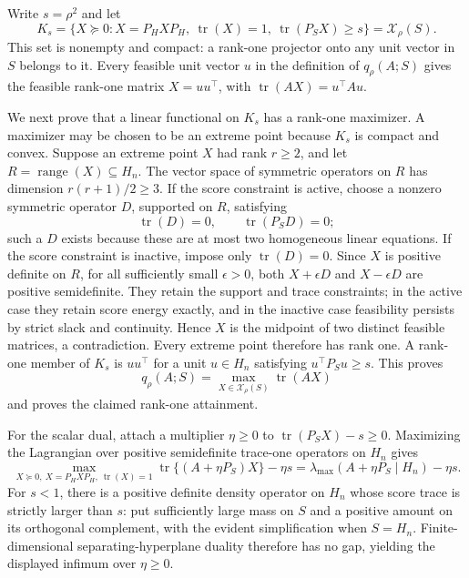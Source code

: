 Write \(s=\rho^2\) and let
\[
K_s=\{X\succeq0:X=P_HXP_H,\ \operatorname{tr}(X)=1,
\ \operatorname{tr}(P_SX)\geq s\}=\mathcal X_\rho(S).
\]
This set is nonempty and compact: a rank-one projector onto any unit vector in \(S\) belongs to it.  Every feasible unit vector \(u\) in the definition of \(q_\rho(A;S)\) gives the feasible rank-one matrix \(X=uu^\top\), with \(\operatorname{tr}(AX)=u^\top Au\).

We next prove that a linear functional on \(K_s\) has a rank-one maximizer.  A maximizer may be chosen to be an extreme point because \(K_s\) is compact and convex.  Suppose an extreme point \(X\) had rank \(r\geq2\), and let \(R=\operatorname{range}(X)\subseteq H_n\).  The vector space of symmetric operators on \(R\) has dimension \(r(r+1)/2\geq3\).  If the score constraint is active, choose a nonzero symmetric operator \(D\), supported on \(R\), satisfying
\[
\operatorname{tr}(D)=0,
\qquad \operatorname{tr}(P_SD)=0;
\]
such a \(D\) exists because these are at most two homogeneous linear equations.  If the score constraint is inactive, impose only \(\operatorname{tr}(D)=0\).  Since \(X\) is positive definite on \(R\), for all sufficiently small \(\epsilon>0\), both \(X+\epsilon D\) and \(X-\epsilon D\) are positive semidefinite.  They retain the support and trace constraints; in the active case they retain score energy exactly, and in the inactive case feasibility persists by strict slack and continuity.  Hence \(X\) is the midpoint of two distinct feasible matrices, a contradiction.  Every extreme point therefore has rank one.  A rank-one member of \(K_s\) is \(uu^\top\) for a unit \(u\in H_n\) satisfying \(u^\top P_Su\geq s\).  This proves
\[
q_\rho(A;S)=\max_{X\in\mathcal X_\rho(S)}\operatorname{tr}(AX)
\]
and proves the claimed rank-one attainment.

For the scalar dual, attach a multiplier \(\eta\geq0\) to \(\operatorname{tr}(P_SX)-s\geq0\).  Maximizing the Lagrangian over positive semidefinite trace-one operators on \(H_n\) gives
\[
\max_{X\succeq0,\ X=P_HXP_H,\ \operatorname{tr}(X)=1}
\operatorname{tr}\{(A+\eta P_S)X\}-\eta s
=\lambda_{\max}(A+\eta P_S\mid H_n)-\eta s.
\]
For \(s<1\), there is a positive definite density operator on \(H_n\) whose score trace is strictly larger than \(s\): put sufficiently large mass on \(S\) and a positive amount on its orthogonal complement, with the evident simplification when \(S=H_n\).  Finite-dimensional separating-hyperplane duality therefore has no gap, yielding the displayed infimum over \(\eta\geq0\).

